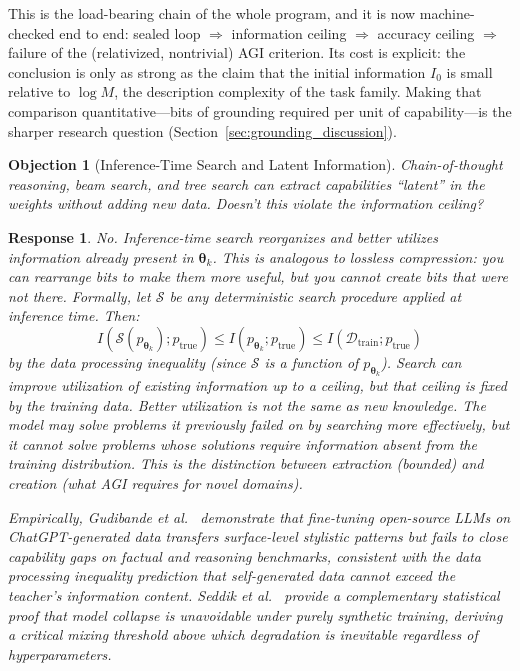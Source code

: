 \documentclass[11pt,a4paper]{article}
\newtheorem{objection}{Objection}
\newtheorem{response}{Response}
\begin{document}
This is the load-bearing chain of the whole program, and it is now machine-checked end to end: sealed loop $\Rightarrow$ information ceiling $\Rightarrow$ accuracy ceiling $\Rightarrow$ failure of the (relativized, nontrivial) AGI criterion. Its cost is explicit: the conclusion is only as strong as the claim that the initial information $I_0$ is small relative to $\log M$, the description complexity of the task family. Making that comparison quantitative---bits of grounding required per unit of capability---is the sharper research question (Section~\ref{sec:grounding_discussion}).

\begin{objection}[Inference-Time Search and Latent Information]
Chain-of-thought reasoning, beam search, and tree search can extract capabilities ``latent'' in the weights without adding new data. Doesn't this violate the information ceiling?
\end{objection}

\begin{response}
No. Inference-time search reorganizes and better utilizes information already present in $\bm{\theta}_k$. This is analogous to lossless compression: you can rearrange bits to make them more useful, but you cannot create bits that were not there. Formally, let $\mathcal{S}$ be any deterministic search procedure applied at inference time. Then:
\begin{equation}
I(\mathcal{S}(p_{\bm{\theta}_k}); p_{\mathrm{true}}) \leq I(p_{\bm{\theta}_k}; p_{\mathrm{true}}) \leq I(\mathcal{D}_{\mathrm{train}}; p_{\mathrm{true}})
\end{equation}
by the data processing inequality (since $\mathcal{S}$ is a function of $p_{\bm{\theta}_k}$). Search can improve \emph{utilization} of existing information up to a ceiling, but that ceiling is fixed by the training data. Better utilization is not the same as new knowledge. The model may solve problems it previously failed on by searching more effectively, but it cannot solve problems whose solutions require information absent from the training distribution. This is the distinction between \emph{extraction} (bounded) and \emph{creation} (what AGI requires for novel domains).

Empirically, Gudibande et al.~\cite{gudibande2023false} demonstrate that fine-tuning open-source LLMs on ChatGPT-generated data transfers surface-level stylistic patterns but fails to close capability gaps on factual and reasoning benchmarks, consistent with the data processing inequality prediction that self-generated data cannot exceed the teacher's information content. Seddik et al.~\cite{seddik2024synthetic} provide a complementary statistical proof that model collapse is unavoidable under purely synthetic training, deriving a critical mixing threshold above which degradation is inevitable regardless of hyperparameters.
\end{response}
\end{document}

